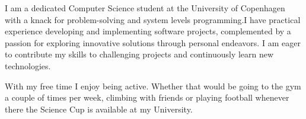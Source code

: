 I am a dedicated Computer Science student at the University of Copenhagen with a
knack for problem-solving and system levels programming.I have practical
experience developing and implementing software projects, complemented by a
passion for exploring innovative solutions through personal endeavors. I am
eager to contribute my skills to challenging projects and continuously learn new
technologies. 

With my free time I enjoy being active. Whether that would be going to
the gym a couple of times per week, climbing with friends or playing football
whenever there the Science Cup is available at my University. 
